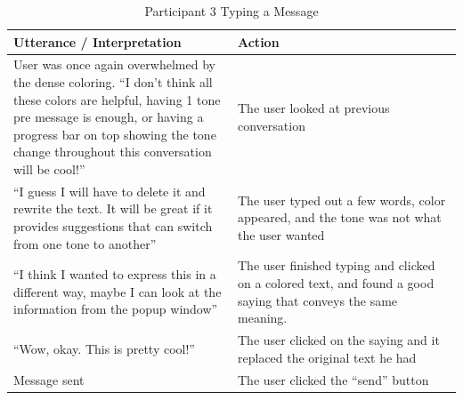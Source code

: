 \documentclass[acmsmall,screen,authorversion,nonacm]{acmart}
\begin{document}
\begin{table}[H]
\begin{tabular}{|p{0.5 \linewidth}|p{0.5 \linewidth}|}
\hline
Utterance / Interpretation                                                                                                                                                                                                                   & Action                                                                                                         \\ \hline
User was once again overwhelmed by the dense coloring. “I don’t think all these colors are helpful, having 1 tone pre message is enough, or having a progress bar on top showing the tone change throughout this conversation will be cool!” & The user looked at previous conversation                                                                       \\ \hline
“I guess I will have to delete it and rewrite the text. It will be great if it provides suggestions that can switch from one tone to another”                                                                                                & The user typed out a few words, color appeared, and the tone was not what the user wanted                      \\ \hline
“I think I wanted to express this in a different way, maybe I can look at the information from the popup window”                                                                                                                             & The user finished typing and clicked on a colored text, and found a good saying that conveys the same meaning. \\ \hline
“Wow, okay. This is pretty cool!”                                                                                                                                                                                                            & The user clicked on the saying and it replaced the original text he had                                        \\ \hline
Message sent                                                                                                                                                                                                                                 & The user clicked the “send” button                                                                             \\ \hline
\end{tabular}
\caption{Participant 3 Typing a Message}
\label{tab:SimpUser3Task2}
\end{table}
\end{document}
